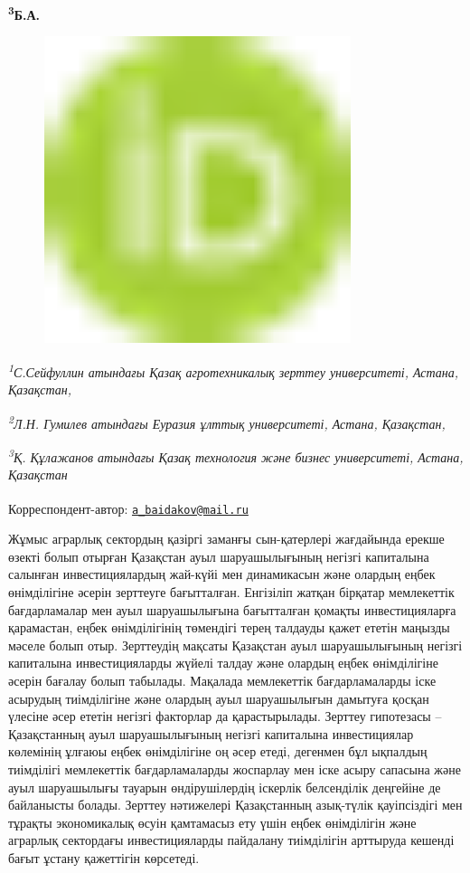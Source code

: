 {{\bfseries \textsuperscript{3}Б.А.
\begin{figure}[H]
	\centering
	\includegraphics[width=0.8\textwidth]{media/ekon2/image1}
	\caption*{}
\end{figure}


\emph{\textsuperscript{1}С.Сейфуллин атындағы Қазақ агротехникалық
зерттеу университеті, Астана, Қазақстан,}

\emph{\textsuperscript{2}Л.Н. Гумилев атындағы Еуразия ұлттық
университеті, Астана, Қазақстан,}

\emph{\textsuperscript{3}Қ. Құлажанов атындағы Қазақ технология және
бизнес университеті, Астана, Қазақстан}

{\bfseries \textsuperscript{\envelope }}Корреспондент-автор:
\href{mailto:a_baidakov@mail.ru}{\nolinkurl{a\_baidakov@mail.ru}}

Жұмыс аграрлық сектордың қазіргі заманғы сын-қатерлері жағдайында ерекше
өзекті болып отырған Қазақстан ауыл шаруашылығының негізгі капиталына
салынған инвестициялардың жай-күйі мен динамикасын және олардың еңбек
өнімділігіне әсерін зерттеуге бағытталған. Енгізіліп жатқан бірқатар
мемлекеттік бағдарламалар мен ауыл шаруашылығына бағытталған қомақты
инвестицияларға қарамастан, еңбек өнімділігінің төмендігі терең талдауды
қажет ететін маңызды мәселе болып отыр. Зерттеудің мақсаты Қазақстан
ауыл шаруашылығының негізгі капиталына инвестицияларды жүйелі талдау
және олардың еңбек өнімділігіне әсерін бағалау болып табылады. Мақалада
мемлекеттік бағдарламаларды іске асырудың тиімділігіне және олардың ауыл
шаруашылығын дамытуға қосқан үлесіне әсер ететін негізгі факторлар да
қарастырылады. Зерттеу гипотезасы -- Қазақстанның ауыл шаруашылығының
негізгі капиталына инвестициялар көлемінің ұлғаюы еңбек өнімділігіне оң
әсер етеді, дегенмен бұл ықпалдың тиімділігі мемлекеттік бағдарламаларды
жоспарлау мен іске асыру сапасына және ауыл шаруашылығы тауарын
өндірушілердің іскерлік белсенділік деңгейіне де байланысты болады.
Зерттеу нәтижелері Қазақстанның азық-түлік қауіпсіздігі мен тұрақты
экономикалық өсуін қамтамасыз ету үшін еңбек өнімділігін және аграрлық
сектордағы инвестицияларды пайдалану тиімділігін арттыруда кешенді бағыт
ұстану қажеттігін көрсетеді.

}}
